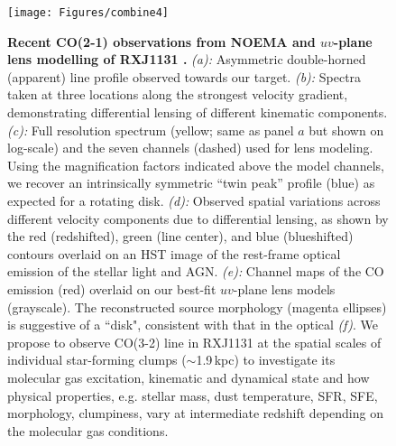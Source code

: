 \documentclass[11pt,a4paper,twoside,graphicx,color]{article}
\newcommand{\bco}{\mbox{CO(2-1)}\xspace}
\newcommand{\cco}{\mbox{CO(3-2)}\xspace}
\newcommand{\kms}{km\,s$^{-1}$\xspace}
\newcommand{\interz}{intermediate-$z$\xspace}
\newcommand{\obs}{observations\xspace}
\begin{document}
\begin{figure}[htbp]
\begin{center}
\texttt{[image: Figures/combine4]}
\caption{
\textbf{Recent \bco \obs from NOEMA and $uv$-plane lens modelling of RXJ1131 \citep{Leung16b}.}
{\em (a):}
Asymmetric double-horned (apparent) line profile observed towards our target.
{\em (b):}
Spectra taken at three locations along the strongest velocity gradient,
demonstrating
differential lensing of different kinematic components.
{\em (c):}
Full resolution spectrum (yellow; same as panel $a$ but shown on log-scale) and the seven channels (dashed) used for lens modeling.
Using the magnification factors indicated above the model channels, we recover an intrinsically symmetric
``twin peak'' profile (blue) as expected for a rotating disk.
{\em (d):}
Observed spatial variations across different velocity components due to
differential lensing,
as shown by the red (redshifted),
green (line center), and blue (blueshifted) contours overlaid on an
HST image of the rest-frame optical emission of the stellar light and AGN.
{\em (e):}
Channel maps of the CO emission (red)
overlaid on our best-fit $uv$-plane lens models (grayscale).
The reconstructed source morphology (magenta ellipses) is suggestive of a ``disk",
consistent with that in the optical {\em (f)}.
We propose to observe \cco line in RXJ1131 at the spatial scales of individual star-forming clumps ($\sim$1.9\,kpc)
to
investigate
its molecular gas excitation, kinematic and dynamical state and how
physical properties, e.g. stellar mass, dust temperature, SFR, SFE, morphology, clumpiness,
vary at intermediate redshift depending on the molecular gas conditions.
\label{fig:combine}}
\vspace{-2.15em}
\end{center}
\end{figure}

\clearpage

\end{document}
